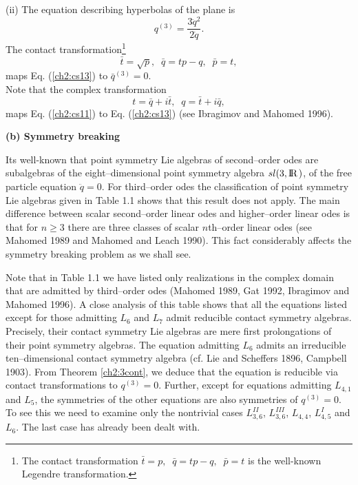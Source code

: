 (ii) The equation describing  hyperbolas of the plane is
\begin{equation}
\label{ch2:cs13}
q^{(3)}=\frac{3\ddot q^2}{2\dot q}.
\end{equation}
The contact transformation\footnote{The contact transformation
$\bar t= p,\;\; \bar q=tp-q,\;\; \bar p=t$ is the well-known Legendre
transformation.}
\begin{equation}
\label{ch2:cs14}
\bar t=\sqrt p,\;\; \bar q=tp-q,\;\; \bar p=t,
\end{equation}
maps Eq. (\ref{ch2:cs13}) to $\bar q^{(3)}=0$.\\
Note that the complex  transformation
\begin{equation}
\label{ch2:cs15}
t=\bar q+i\bar t,\;\; q=\bar t+i\bar q,
\end{equation}
maps Eq. (\ref{ch2:cs11}) to Eq. (\ref{ch2:cs13}) (see Ibragimov and
Mahomed 1996).

{\bf (b) Symmetry breaking}

Its well-known that point symmetry Lie algebras of second--order odes
are subalgebras of the eight--dimensional point symmetry algebra
$sl(3,\mathrm{I\!R\!}\;)$, of the free particle equation $\ddot q=0$. For third--order
odes  the classification of point symmetry Lie algebras given
in Table 1.1  shows that this result does not apply.
The main difference between scalar second--order linear odes and
higher--order linear odes is that  for $n\ge 3$ there are three
classes of scalar $n$th--order linear
odes (see Mahomed 1989 and Mahomed and Leach 1990). This fact considerably
affects the symmetry breaking problem as we shall see.

Note that in Table 1.1 we have listed only realizations in the complex domain
that are admitted by third--order odes (Mahomed 1989, Gat 1992, Ibragimov
and  Mahomed 1996).  A close analysis of this table shows that all the
equations listed except for those admitting $L_6$ and $L_7$ admit
reducible contact symmetry algebras. Precisely, their contact symmetry Lie
algebras are mere first prolongations of their point symmetry algebras. The
equation  admitting $L_6$ admits an irreducible
ten--dimensional contact symmetry algebra (cf. Lie and Scheffers 1896,
Campbell 1903). From
Theorem \ref{ch2:3cont}, we deduce that the equation is reducible via contact
transformations to
$q^{(3)}=0$. Further, except for equations admitting $L_{4,1}$ and $L_5$, the
symmetries of the other equations are also symmetries of $q^{(3)}=0$.
To see this
we need to examine only the nontrivial cases $L_{3,6}^{II}$, $L_{3,6}^{III}$,
$L_{4,4}$, $L_{4,5}^I$ and $L_6$. The last case has already been dealt with. 

